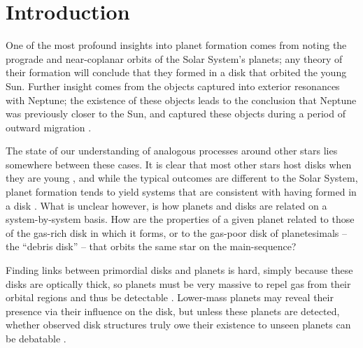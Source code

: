 \documentclass[a4paper,fleqn,usenatbib]{mnras}
\begin{document}


\section{Introduction}

One of the most profound insights into planet formation comes from
noting the prograde and near-coplanar orbits of the Solar System's
planets; any theory of their formation will conclude that they formed in
a disk that orbited the young Sun. Further insight comes from the
objects captured into exterior resonances with Neptune; the existence of
these objects leads to the conclusion that Neptune was previously closer
to the Sun, and captured these objects during a period of outward
migration \citep{1993Natur.365..819M}.

The state of our understanding of analogous processes around other stars
lies somewhere between these cases. It is clear that most other stars
host disks when they are young \citep[e.g.][]{2001ApJ...553L.153H}, and
while the typical outcomes are different to the Solar System, planet
formation tends to yield systems that are consistent with having formed
in a disk \citep[e.g.][]{2012Natur.487..449S}. What is unclear however,
is how planets and disks are related on a system-by-system basis. How
are the properties of a given planet related to those of the gas-rich
disk in which it forms, or to the gas-poor disk of planetesimals --
the ``debris disk'' -- that orbits the same star on the main-sequence?

Finding links between primordial disks and planets is hard, simply
because these disks are optically thick, so planets must be very massive
to repel gas from their orbital regions and thus be detectable
\citep[e.g.][]{2007prpl.conf..655P}. Lower-mass planets may reveal their
presence via their influence on the disk, but unless these planets are
detected, whether observed disk structures truly owe their existence to
unseen planets can be debatable
\citep{2015ApJ...813...88Z,2017ApJ...839L..24M}.
\end{document}
